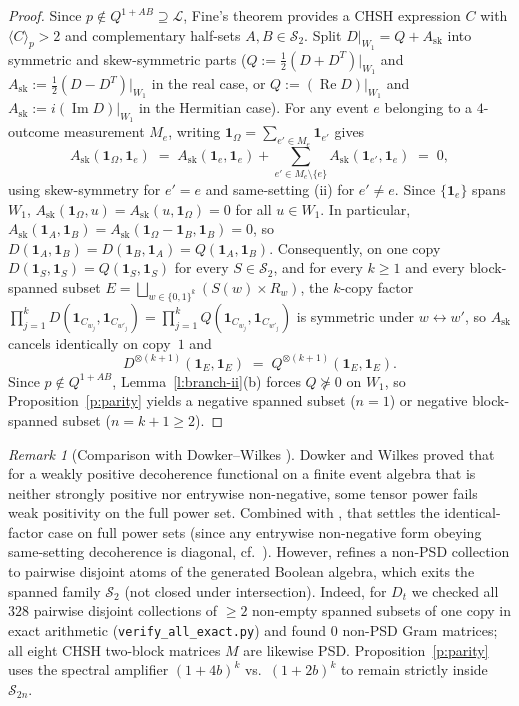 \documentclass[11pt,a4paper]{article}
\theoremstyle{definition}
\theoremstyle{remark}
\newtheorem{remark}[theorem]{Remark}
\newcommand{\ind}[1]{\mathbf{1}_{#1}}
\newcommand{\ev}[1]{\langle #1\rangle_p}
\newcommand{\QAB}{Q^{1+AB}}
\newcommand{\Loc}{\mathcal{L}}
\begin{document}
\begin{proof}
Since $p \notin \QAB \supseteq \Loc$, Fine's theorem \cite{Fine} provides a CHSH expression $C$ with $\ev{C} > 2$ and complementary half-sets $A, B \in \mathcal{S}_2$. Split $D|_{W_1} = Q + A_{\mathrm{sk}}$ into symmetric and skew-symmetric parts ($Q := \frac{1}{2}(D + D^T)|_{W_1}$ and $A_{\mathrm{sk}} := \frac{1}{2}(D - D^T)|_{W_1}$ in the real case, or $Q := (\operatorname{Re} D)|_{W_1}$ and $A_{\mathrm{sk}} := i(\operatorname{Im} D)|_{W_1}$ in the Hermitian case). For any event $e$ belonging to a $4$-outcome measurement $M_e$, writing $\ind\Omega = \sum_{e' \in M_e} \ind{e'}$ gives
\[
  A_{\mathrm{sk}}(\ind\Omega, \ind e) \;=\; A_{\mathrm{sk}}(\ind e, \ind e) + \sum_{e' \in M_e \setminus \{e\}} A_{\mathrm{sk}}(\ind{e'}, \ind e) \;=\; 0,
\]
using skew-symmetry for $e' = e$ and same-setting (ii) for $e' \neq e$. Since $\{\ind e\}$ spans $W_1$, $A_{\mathrm{sk}}(\ind\Omega, u) = A_{\mathrm{sk}}(u, \ind\Omega) = 0$ for all $u \in W_1$. In particular, $A_{\mathrm{sk}}(\ind A, \ind B) = A_{\mathrm{sk}}(\ind\Omega - \ind B, \ind B) = 0$, so $D(\ind A, \ind B) = D(\ind B, \ind A) = Q(\ind A, \ind B)$. Consequently, on one copy $D(\ind S, \ind S) = Q(\ind S, \ind S)$ for every $S \in \mathcal{S}_2$, and for every $k \ge 1$ and every block-spanned subset $E = \bigsqcup_{w \in \{0,1\}^k} (S(w) \times R_w)$, the $k$-copy factor $\prod_{j=1}^k D(\ind{C_{w_j}}, \ind{C_{w'_j}}) = \prod_{j=1}^k Q(\ind{C_{w_j}}, \ind{C_{w'_j}})$ is symmetric under $w \leftrightarrow w'$, so $A_{\mathrm{sk}}$ cancels identically on copy~$1$ and
\[
  D^{\otimes(k+1)}(\ind E, \ind E) \;=\; Q^{\otimes(k+1)}(\ind E, \ind E).
\]
Since $p \notin \QAB$, Lemma~\ref{l:branch-ii}(b) forces $Q \not\succeq 0$ on $W_1$, so Proposition~\ref{p:parity} yields a negative spanned subset ($n = 1$) or negative block-spanned subset ($n = k+1 \ge 2$).
\end{proof}

\begin{remark}[Comparison with Dowker--Wilkes \cite{DW}]\label{r:dw-compare}
Dowker and Wilkes \cite[Lemma~12]{DW} proved that for a weakly positive decoherence functional on a finite event algebra that is neither strongly positive nor entrywise non-negative, some tensor power fails weak positivity on the full power set. Combined with \cite[Theorem~21]{DHW}, that settles the identical-factor case on full power sets (since any entrywise non-negative form obeying same-setting decoherence is diagonal, cf.\ \cite{BN}). However, \cite[Lemma~12]{DW} refines a non-PSD collection to pairwise disjoint atoms of the generated Boolean algebra, which exits the spanned family $\mathcal{S}_2$ (not closed under intersection). Indeed, for $D_t$ we checked all $328$ pairwise disjoint collections of $\ge 2$ non-empty spanned subsets of one copy in exact arithmetic (\texttt{verify\_all\_exact.py}) and found $0$ non-PSD Gram matrices; all eight CHSH two-block matrices $M$ are likewise PSD. Proposition~\ref{p:parity} uses the spectral amplifier $(1+4b)^k$ vs.\ $(1+2b)^k$ to remain strictly inside $\mathcal{S}_{2n}$.
\end{remark}
\end{document}
